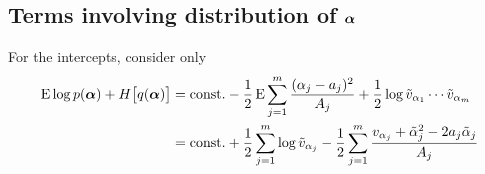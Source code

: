 %
%

\subsection{Terms involving distribution of \texorpdfstring{${\bm\alpha}$}{$\alpha$}}

For the intercepts, consider only
\begin{align*}
  \operatorname{E} \log p({\bm\alpha}) + H \big[q({\bm\alpha}) \big] 
  &=  \text{const.}\hspace{0.01em}  - \frac{1}{2} \operatorname{E} \sum_{j=1}^m \frac{(\alpha_j - a_j)^2}{A_j}    + \frac{1}{2} \log \tilde v_{\alpha_1}\cdots\tilde v_{\alpha_m} \\ 
  &= \text{const.}\hspace{0.01em} + \frac{1}{2} \sum_{j=1}^m \log \tilde v_{\alpha_j} - \frac{1}{2} \sum_{j=1}^m \frac{v_{\alpha_j} + \tilde\alpha_j^2  -2a_j \tilde\alpha_j}{A_j} 
\end{align*}

